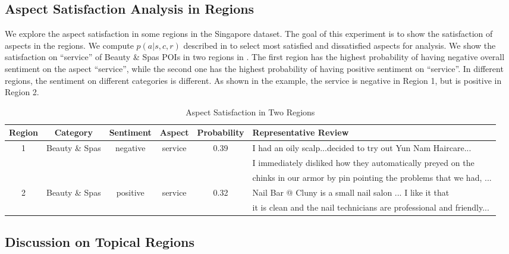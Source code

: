 \subsection{Aspect Satisfaction Analysis in Regions}
\label{sec:satisfy}
We explore the aspect satisfaction in some regions in the Singapore
dataset. The goal of this experiment is to show the satisfaction
of aspects in the regions.
We compute $p(a|s,c,r)$ described in  to
select most satisfied and dissatisfied aspects for analysis.
We show the satisfaction on ``service'' of Beauty \& Spas POIs in two regions
in . The first region has the highest probability of
having negative overall sentiment on the aspect ``service'', while
the second one has the highest probability of having positive sentiment
on ``service''. In different regions, the
sentiment on different categories is different. As shown in the example,
the service is negative in Region 1, but is positive in Region 2.

\begin{table*}
\centering
\caption{Aspect Satisfaction in Two Regions}
\begin{tabular}{c|c|c|c|c|l}
\hline
Region & Category & Sentiment & Aspect & Probability & Representative Review\\
\hline
1 & Beauty \& Spas  & negative  & service  & 0.39 & I had an oily scalp...decided to try out Yun Nam Haircare... \\
 & & &  & & I immediately disliked how they automatically preyed on the \\
&&&&& chinks in our armor by pin pointing the problems that we had, ...\\
\hline
2 & Beauty \& Spas  & positive  & service  & 0.32  & Nail Bar @ Cluny is a small nail salon ... I like it that\\
& & &  & &  it is clean and the nail technicians are professional and friendly...\\
\hline
\end{tabular}
\label{tab:asr}
\end{table*}

\subsection{Discussion on Topical Regions}
\label{sec:regions}

